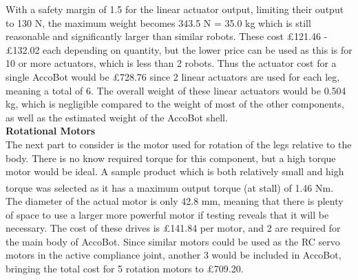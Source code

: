 \documentclass[11pt]{article}		%
\newcommand{\supercite}[1]{\textsuperscript{\cite{#1}}}		%
\begin{document}
			With a safety margin of 1.5 for the linear actuator output, limiting their output to 130 N, the maximum weight becomes 343.5 N = 35.0 kg which is still reasonable and significantly larger than similar robots.
			These cost £121.46 - £132.02 each depending on quantity, but the lower price can be used as this is for 10 or more actuators, which is less than 2 robots.
			Thus the actuator cost for a single AccoBot would be £728.76 since 2 linear actuators are used for each leg, meaning a total of 6.
			The overall weight of these linear actuators would be 0.504 kg, which is negligible compared to the weight of most of the other components, as well as the estimated weight of the AccoBot shell.
			\\
			\textbf{Rotational Motors}
			\\
			The next part to consider is the motor used for rotation of the legs relative to the body. There is no know required torque for this component, but a high torque motor would be ideal.
			A sample product which is both relatively small and high torque was selected\supercite{rsproRotation} as it has a maximum output torque (at stall) of 1.46 Nm.
			The diameter of the actual motor is only 42.8 mm, meaning that there is plenty of space to use a larger more powerful motor if testing reveals that it will be necessary.
			The cost of these drives is £141.84 per motor, and 2 are required for the main body of AccoBot.
			Since similar motors could be used as the RC servo motors in the active compliance joint, another 3 would be included in AccoBot, bringing the total cost for 5 rotation motors to £709.20.
			
\end{document}
